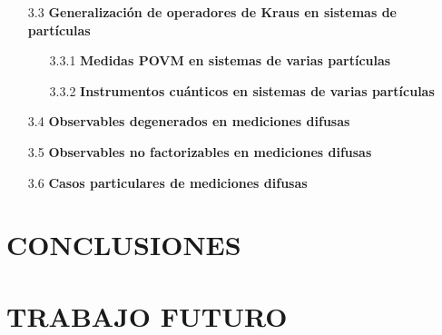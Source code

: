 \documentclass[12pt,oneside]{book}\raggedbottom{} %
\begin{document}
\begin{sloppypar}
{{\begin{itemize}
 
  \item[3.3 ] \textbf{Generalización de operadores de Kraus en sistemas de \texorpdfstring{}{N} partículas}

\begin{itemize}
  \item[3.3.1] \textbf{Medidas POVM en sistemas de varias partículas}
  \item[3.3.2] \textbf{Instrumentos cuánticos en sistemas de varias partículas} 
\end{itemize}

\item[3.4]\textbf{Observables degenerados en mediciones difusas} 

\item[3.5] \textbf{Observables no factorizables en mediciones difusas} %

\item[3.6] \textbf{Casos particulares de mediciones difusas} 



\end{itemize}

















\section*{CONCLUSIONES }
\section*{TRABAJO FUTURO}

\nocite{Hall2013}
\nocite{sakurai2017modern}
\nocite{wilde2011classical}
\nocite{2007geometry}
}

\newpage
\nocite{gomez2010introduccion}



}
\end{sloppypar}
\end{document}
